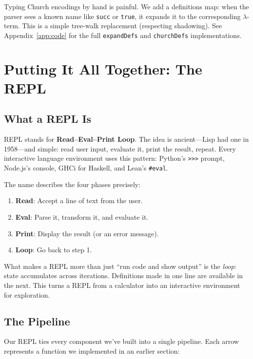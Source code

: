 \documentclass[11pt,a4paper]{article}
\theoremstyle{definition}
\newcommand{\lam}{\lambda}
\begin{document}
Typing Church encodings by hand is painful. We add a definitions map: when
the parser sees a known name like \texttt{succ} or \texttt{true}, it expands
it to the corresponding $\lam$-term. This is a simple tree-walk replacement
(respecting shadowing). See Appendix~\ref{app:code} for the full
\texttt{expandDefs} and \texttt{churchDefs} implementations.

\section{Putting It All Together: The REPL}\label{sec:repl}

\subsection{What a REPL Is}

REPL stands for \textbf{Read--Eval--Print Loop}. The idea is ancient---Lisp
had one in 1958---and simple: read user input, evaluate it, print the result,
repeat. Every interactive language environment uses this pattern: Python's
\texttt{>>>} prompt, Node.js's console, GHCi for Haskell, and Lean's
\texttt{\#eval}.

The name describes the four phases precisely:

\begin{enumerate}[leftmargin=2em]
\item \textbf{Read}: Accept a line of text from the user.
\item \textbf{Eval}: Parse it, transform it, and evaluate it.
\item \textbf{Print}: Display the result (or an error message).
\item \textbf{Loop}: Go back to step 1.
\end{enumerate}

What makes a REPL more than just ``run code and show output'' is the
\emph{loop}: state accumulates across iterations. Definitions made in one
line are available in the next. This turns a REPL from a calculator into
an interactive environment for exploration.

\subsection{The Pipeline}

Our REPL ties every component we've built into a single pipeline. Each arrow
represents a function we implemented in an earlier section:
\end{document}
